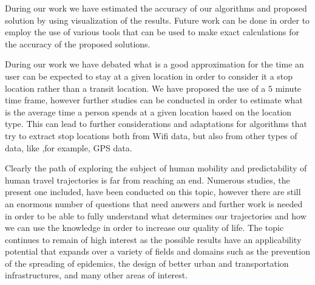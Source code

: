During our work we have estimated the accuracy of our algorithms and proposed
solution by using visualization of the results. Future work can be done in order
to employ the use of various tools that can be used to make exact calculations
for the accuracy of the proposed solutions.

During our work we have debated what is a good
approximation for the time an user can be expected to stay at a given location in order to consider it a stop
location rather than a transit location. We have proposed the use of a $5$
minute time frame, however further studies can be conducted in order to estimate
what is the average time a person spends at a given location based on the
location type. This can lead to further considerations and adaptations for
algorithms that try to extract stop locations both from Wifi data, but also from
other types of data, like ,for example, GPS data.

Clearly the path of exploring the subject of human mobility and predictability
of human travel trajectories is far from reaching an end. Numerous studies, the
present one included, have been conducted on this topic, however there are
still an enormous number of questions that need answers and further work is
needed in order to be able to fully understand what determines our trajectories
and how we can use the knowledge in order to increase our quality of life. The
topic continues to remain of high interest as the possible results have an
applicability potential that expands over a variety of fields and domains such
as the prevention of the spreading of epidemics, the design of better urban and
transportation infrastructures, and many other areas of interest.